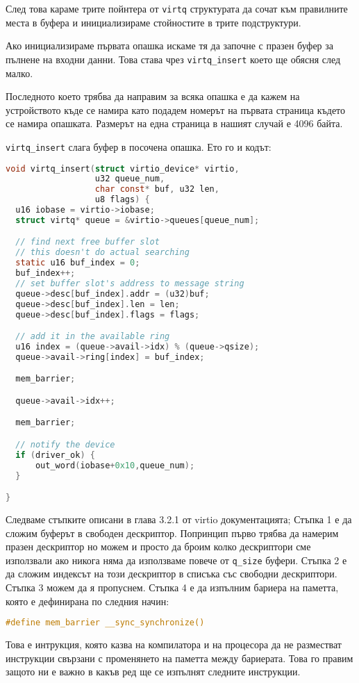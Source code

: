 След това караме трите пойнтера от {\tt virtq} структурата да сочат към правилните места в буфера и инициализираме стойностите в трите подструктури.

Ако инициализираме първата опашка искаме тя да започне с празен буфер за пълнене на входни данни. Това става чрез {\tt virtq\_insert} което ще обясня след малко.

Последното което трябва да направим за всяка опашка е да кажем на устройството къде се намира като подадем номерът на първата страница където се намира опашката. Размерът на една страница в нашият случай е 4096 байта.

{\tt virtq\_insert} слага буфер в посочена опашка. Ето го и кодът:
\begin{lstlisting}[language=C]
void virtq_insert(struct virtio_device* virtio,
                  u32 queue_num,
                  char const* buf, u32 len,
                  u8 flags) {
  u16 iobase = virtio->iobase;
  struct virtq* queue = &virtio->queues[queue_num];

  // find next free buffer slot
  // this doesn't do actual searching
  static u16 buf_index = 0;
  buf_index++;
  // set buffer slot's address to message string
  queue->desc[buf_index].addr = (u32)buf;
  queue->desc[buf_index].len = len;
  queue->desc[buf_index].flags = flags;

  // add it in the available ring
  u16 index = (queue->avail->idx) % (queue->qsize);
  queue->avail->ring[index] = buf_index;

  mem_barrier;

  queue->avail->idx++;

  mem_barrier;

  // notify the device
  if (driver_ok) {
      out_word(iobase+0x10,queue_num);
  }

}
\end{lstlisting}
Следваме стъпките описани в глава 3.2.1 от virtio документацията; Стъпка 1 е да сложим буферът в свободен дескриптор. Попринцип първо трябва да намерим празен дескриптор но можем и просто да броим колко дескриптори сме използвали ако никога няма да използваме повече от {\tt q\_size} буфери. Стъпка 2 е да сложим индексът на този дескриптор в списъка със свободни дескриптори. Стъпка 3 можем да я пропуснем. Стъпка 4 е да изпълним бариера на паметта, която е дефинирана по следния начин:
\begin{lstlisting}[language=C]
#define mem_barrier __sync_synchronize()
\end{lstlisting}
Това е интрукция, която казва на компилатора и на процесора да не разместват инструкции свързани с променянето на паметта между бариерата. Това го правим защото ни е важно в какъв ред ще се изпълнят следните инструкции.

